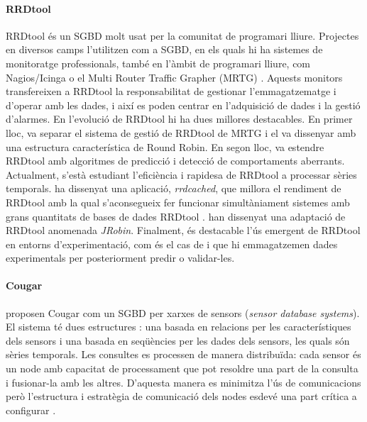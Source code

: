 \paragraph{RRDtool} RRDtool \parencite{rrdtool} {é}s un SGBD molt usat per la comunitat de programari lliure. Projectes en diversos camps l'utilitzen com a SGBD, en els quals hi ha sistemes de monitoratge professionals, també en l'àmbit de programari lliure, com Nagios/Icinga \parencite{nagios,icinga} o el Multi Router Traffic Grapher (MRTG) \parencite{mrtg}. Aquests monitors transfereixen a RRDtool la responsabilitat de gestionar l'emmagatzematge i d'operar amb les dades, i així es poden centrar en l'adquisició de dades i la gestió d'alarmes. 
En l'evolució de RRDtool hi ha dues millores destacables. En primer lloc, \textcite{lisa98:oetiker} va separar el sistema de gestió de RRDtool de MRTG i el va dissenyar amb una estructura característica de Round Robin. En segon lloc,  \textcite{lisa00:brutlag} va estendre RRDtool amb algoritmes de predicció i detecció de comportaments aberrants. 
Actualment, s'està estudiant l'eficiència i rapidesa de RRDtool a processar sèries temporals. \textcite{carder:rrdcached} ha dissenyat una aplicació, \emph{rrdcached}, que millora el rendiment de RRDtool amb la qual s'aconsegueix fer funcionar  simultàniament sistemes amb grans quantitats de bases de dades RRDtool \parencite{lisa07:plonka}. \textcite{jrobin} han dissenyat una adaptació de RRDtool anomenada \emph{JRobin}. 
Finalment, és destacable l'ús emergent de RRDtool en entorns d'experimentació, com és el cas de \textcite{zhang07} i \textcite{chilingaryan10} que hi emmagatzemen dades experimentals per posteriorment predir o validar-les.


\paragraph{Cougar} \textcite{cougar} proposen Cougar com un SGBD per xarxes de sensors (\emph{sensor database systems}). El sistema té dues estructures \parencite{bonnet01}: una basada en relacions per les característiques dels sensors i una basada en seqüències per les dades dels sensors, les quals són sèries temporals.
Les consultes es processen de manera distribuïda: cada sensor és un node amb capacitat de processament que pot resoldre una part de la consulta i fusionar-la amb les altres. D'aquesta manera es minimitza l'ús de comunicacions però l'estructura i estratègia de comunicació dels nodes esdevé una part crítica a configurar \parencite{demers03}.

